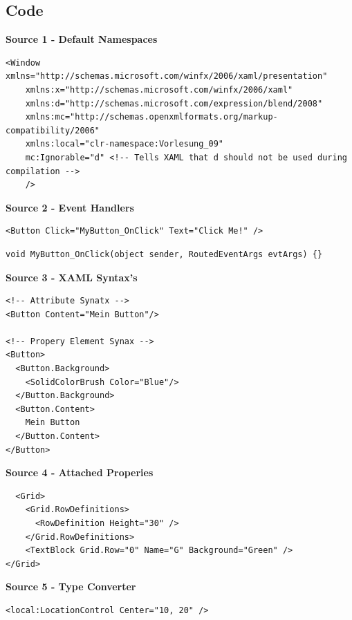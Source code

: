 \documentclass[10pt,twoside,landscape]{article}
\begin{document}
\begin{multicols}{2}
\section{Code}
\label{sec:org00e072c}
\textbf{Source 1 - Default Namespaces}
\lstset{language=XML,label= ,caption= ,captionpos=b,numbers=none}
\begin{lstlisting}
<Window xmlns="http://schemas.microsoft.com/winfx/2006/xaml/presentation"
	xmlns:x="http://schemas.microsoft.com/winfx/2006/xaml"
	xmlns:d="http://schemas.microsoft.com/expression/blend/2008"
	xmlns:mc="http://schemas.openxmlformats.org/markup-compatibility/2006"
	xmlns:local="clr-namespace:Vorlesung_09"
	mc:Ignorable="d" <!-- Tells XAML that d should not be used during compilation -->
	/>
\end{lstlisting}

\textbf{Source 2 - Event Handlers}
\lstset{language=XML,label= ,caption= ,captionpos=b,numbers=none}
\begin{lstlisting}
<Button Click="MyButton_OnClick" Text="Click Me!" />
\end{lstlisting}

\lstset{language=csharp,label= ,caption= ,captionpos=b,numbers=none}
\begin{lstlisting}
void MyButton_OnClick(object sender, RoutedEventArgs evtArgs) {}
\end{lstlisting}

\textbf{Source 3 - XAML Syntax's}
\lstset{language=XML,label= ,caption= ,captionpos=b,numbers=none}
\begin{lstlisting}
<!-- Attribute Synatx -->
<Button Content="Mein Button"/>

<!-- Propery Element Synax -->
<Button>
  <Button.Background>
    <SolidColorBrush Color="Blue"/>
  </Button.Background>
  <Button.Content>
    Mein Button
  </Button.Content>
</Button>
\end{lstlisting}


\textbf{Source 4 - Attached Properies}
\lstset{language=XML,label= ,caption= ,captionpos=b,numbers=none}
\begin{lstlisting}
  <Grid>
    <Grid.RowDefinitions>
      <RowDefinition Height="30" />
    </Grid.RowDefinitions>
    <TextBlock Grid.Row="0" Name="G" Background="Green" />
</Grid>
\end{lstlisting}

\textbf{Source 5 - Type Converter}
\lstset{language=XML,label= ,caption= ,captionpos=b,numbers=none}
\begin{lstlisting}
<local:LocationControl Center="10, 20" />
\end{lstlisting}


\end{multicols}
\end{document}
